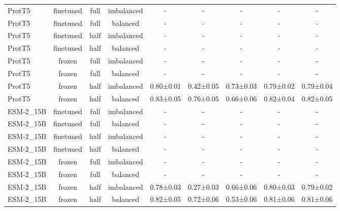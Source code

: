 \begin{tabular}{lcccccccc}
      ProtT5 &      finetuned &      full & imbalanced &         - &         - &         - &         - &         - \\
      ProtT5 &      finetuned &      full &   balanced &         - &         - &         - &         - &         - \\
      ProtT5 &      finetuned &      half & imbalanced &         - &         - &         - &         - &         - \\
      ProtT5 &      finetuned &      half &   balanced &         - &         - &         - &         - &         - \\
      ProtT5 &         frozen &      full & imbalanced &         - &         - &         - &         - &         - \\
      ProtT5 &         frozen &      full &   balanced &         - &         - &         - &         - &         - \\
      ProtT5 &         frozen &      half & imbalanced & 0.80±0.01 & 0.42±0.05 & 0.73±0.03 & 0.79±0.02 & 0.79±0.04 \\
      ProtT5 &         frozen &      half &   balanced & 0.83±0.05 & 0.76±0.05 & 0.66±0.06 & 0.82±0.04 & 0.82±0.05 \\
   ESM-2\_15B &      finetuned &      full & imbalanced &         - &         - &         - &         - &         - \\
   ESM-2\_15B &      finetuned &      full &   balanced &         - &         - &         - &         - &         - \\
   ESM-2\_15B &      finetuned &      half & imbalanced &         - &         - &         - &         - &         - \\
   ESM-2\_15B &      finetuned &      half &   balanced &         - &         - &         - &         - &         - \\
   ESM-2\_15B &         frozen &      full & imbalanced &         - &         - &         - &         - &         - \\
   ESM-2\_15B &         frozen &      full &   balanced &         - &         - &         - &         - &         - \\
   ESM-2\_15B &         frozen &      half & imbalanced & 0.78±0.03 & 0.27±0.03 & 0.66±0.06 & 0.80±0.03 & 0.79±0.02 \\
   ESM-2\_15B &         frozen &      half &   balanced & 0.82±0.05 & 0.72±0.06 & 0.53±0.06 & 0.81±0.06 & 0.81±0.06 \\
\bottomrule
\end{tabular}
